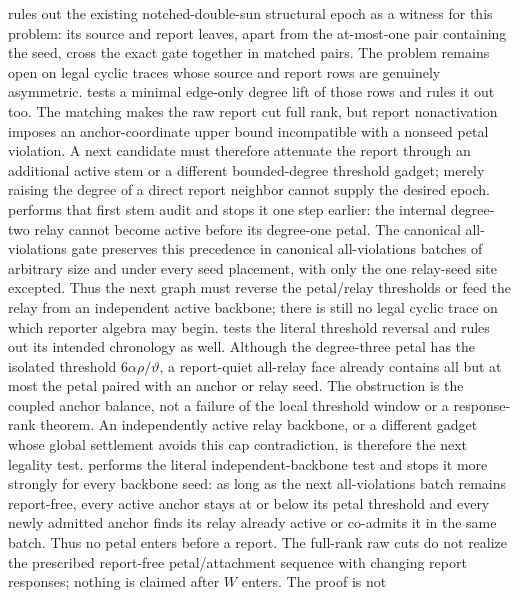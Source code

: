  rules out the existing
notched-double-sun structural epoch as a witness for this problem: its source
and report leaves, apart from the at-most-one pair containing the seed, cross
the exact gate together in matched pairs.  The problem remains open on legal
cyclic traces whose source and report rows are genuinely asymmetric.
 tests a minimal edge-only
degree lift of those rows and rules it out too.  The matching makes the raw
report cut full rank, but report nonactivation imposes an anchor-coordinate
upper bound incompatible with a nonseed petal violation.  A next candidate
must therefore attenuate the report through an additional active stem or a
different bounded-degree threshold gadget; merely raising the degree of a
direct report neighbor cannot supply the desired epoch.
 performs that first
stem audit and stops it one step earlier: the internal degree-two relay cannot
become active before its degree-one petal.  The canonical all-violations gate preserves
this precedence in canonical all-violations batches of arbitrary size and
under every seed placement, with
only the one relay-seed site excepted.  Thus the next graph must reverse the
petal/relay thresholds or feed the relay from an independent active backbone;
there is still no legal cyclic trace on which reporter algebra may begin.
 tests the literal threshold
reversal and rules out its intended chronology as well.  Although the
degree-three petal has the isolated threshold $6\alpha\rho/\vartheta$, a
report-quiet all-relay face already contains all but at most the petal paired
with an anchor or relay seed.  The obstruction is the coupled anchor balance,
not a failure of the local threshold window or a response-rank theorem.  An
independently active relay backbone, or a different gadget whose global
settlement avoids this cap contradiction, is therefore the next legality
test.
 performs the literal
independent-backbone test and stops it more strongly for every backbone seed:
as long as the next all-violations batch remains report-free, every active
anchor stays at or below its petal threshold and every newly admitted anchor
finds its relay already active or co-admits it in the same batch.  Thus no
petal enters before a report.  The full-rank raw cuts do not realize the
prescribed report-free petal/attachment sequence with changing report
responses; nothing is claimed after $W$ enters.  The proof is not
